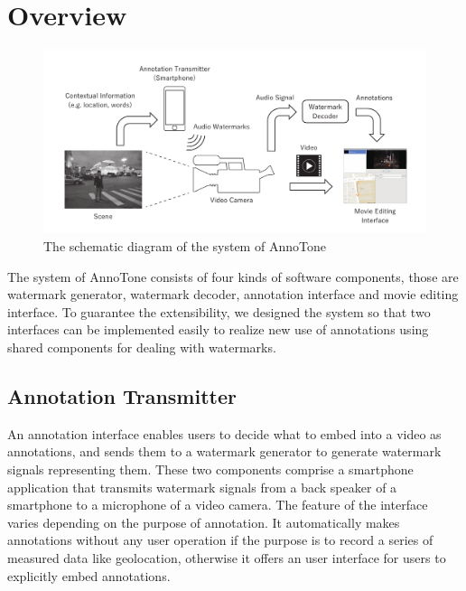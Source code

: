 \chapter{Overview}

\begin{figure}[htbp]
 \begin{center}
  \includegraphics[width=150mm]{overview.pdf}
 \end{center}
 \caption{The schematic diagram of the system of AnnoTone}
 \label{fig:one}
\end{figure}

The system of AnnoTone consists of four kinds of software components, those are watermark generator, watermark decoder, annotation interface and movie editing interface.
To guarantee the extensibility, we designed the system so that two interfaces can be implemented easily to realize new use of annotations using shared components for dealing with watermarks.

\section{Annotation Transmitter}
An annotation interface enables users to decide what to embed into a video as annotations, and sends them to a watermark generator to generate watermark signals representing them.
These two components comprise a smartphone application that transmits watermark signals from a back speaker of a smartphone to a microphone of a video camera.
The feature of the interface varies depending on the purpose of annotation.
It automatically makes annotations without any user operation if the purpose is to record a series of measured data like geolocation, otherwise it offers an user interface for users to explicitly embed annotations.

